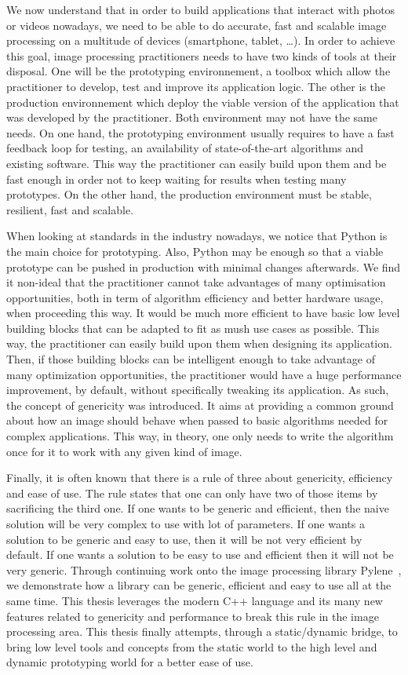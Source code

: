 We now understand that in order to build applications that interact with photos or videos nowadays, we need to be able
to do accurate, fast and scalable image processing on a multitude of devices (smartphone, tablet, \ldots). In order to
achieve this goal, image processing practitioners needs to have two kinds of tools at their disposal. One will be the
prototyping environnement, a toolbox which allow the practitioner to develop, test and improve its application logic.
The other is the production environnement which deploy the viable version of the application that was developed by the
practitioner. Both environment may not have the same needs. On one hand, the prototyping environment usually requires to
have a fast feedback loop for testing, an availability of state-of-the-art algorithms and existing software. This way
the practitioner can easily build upon them and be fast enough in order not to keep waiting for results when testing
many prototypes. On the other hand, the production environment must be stable, resilient, fast and scalable.

When looking at standards in the industry nowadays, we notice that Python is the main choice for prototyping. Also,
Python may be enough so that a viable prototype can be pushed in production with minimal changes afterwards. We find it
non-ideal that the practitioner cannot take advantages of many optimisation opportunities, both in term of algorithm
efficiency and better hardware usage, when proceeding this way. It would be much more efficient to have basic low level
building blocks that can be adapted to fit as mush use cases as possible. This way, the practitioner can easily build
upon them when designing its application. Then, if those building blocks can be intelligent enough to take advantage of
many optimization opportunities, the practitioner would have a huge performance improvement, by default, without
specifically tweaking its application. As such, the concept of genericity was introduced. It aims at providing a common
ground about how an image should behave when passed to basic algorithms needed for complex applications. This way, in
theory, one only needs to write the algorithm once for it to work with any given kind of image.

Finally, it is often known that there is a rule of three about genericity, efficiency and ease of use. The rule states
that one can only have two of those items by sacrificing the third one. If one wants to be generic and efficient, then
the naive solution will be very complex to use with lot of parameters. If one wants a solution to be generic and easy to
use, then it will be not very efficient by default. If one wants a solution to be easy to use and efficient then it will
not be very generic. Through continuing work onto the image processing library Pylene~\cite{carlinet.2018.pylena}, we
demonstrate how a library can be generic, efficient and easy to use all at the same time. This thesis leverages the
modern C++ language and its many new features related to genericity and performance to break this rule in the image
processing area. This thesis finally attempts, through a static/dynamic bridge, to bring low level tools and concepts
from the static world to the high level and dynamic prototyping world for a better ease of use.

